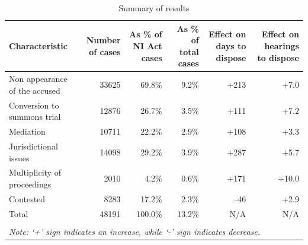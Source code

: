 \documentclass[12pt,a4paper]{article}
\begin{document}
{\footnotesize \begin{longtable}{@{}p{2.5cm}rrrrr}
 \caption{Summary of results}\label{tab:summary_results}\\
 \toprule
 \textbf{Characteristic} & \multicolumn{1}{p{2cm}}{\textbf{Number of cases}} &
 \multicolumn{1}{p{2cm}}{\textbf{As \% of NI Act cases}}
 & \multicolumn{1}{p{2cm}}{\textbf{As \% of total cases}}
 & \multicolumn{1}{p{2cm}}{\textbf{Effect on days to dispose}} &
 \multicolumn{1}{p{2cm}}{\textbf{Effect on hearings to dispose}}
 \\
 \midrule
 Non appearance of the accused & 33625 & 69.8\% & 9.2\% & +213 & +7.0 \\ \midrule
 Conversion to summons trial & 12876 & 26.7\% & 3.5\% & +111 & +7.2 \\ \midrule
 Mediation & 10711 & 22.2\% & 2.9\% & +108 & +3.3 \\ \midrule
 Jurisdictional issues & 14098 & 29.2\% & 3.9\% & +287 & +5.7 \\ \midrule
 Multiplicity of proceedings & 2010 & 4.2\% & 0.6\% & +171 & +10.0 \\ \midrule
 Contested & 8283 & 17.2\% & 2.3\% & --46 & +2.9 \\ \midrule
 Total & 48191 & 100.0\% & 13.2\% & N/A & N/A \\
 \bottomrule
 \\
 \multicolumn{6}{l}{{\footnotesize \emph{Note: `+' sign
 indicates an increase, while `-' sign indicates decrease.}}}\\
\end{longtable}
}
\end{document}
